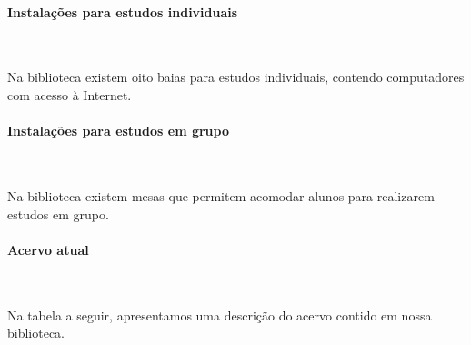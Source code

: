
\paragraph{Instalações para estudos individuais}\

Na biblioteca existem oito baias para estudos individuais, contendo computadores com acesso à Internet. 

\paragraph{Instalações para estudos em grupo}\

Na biblioteca existem mesas que permitem acomodar alunos para realizarem estudos em grupo.

\paragraph{Acervo atual}\

Na tabela a seguir, apresentamos uma descrição do acervo contido em nossa biblioteca.

